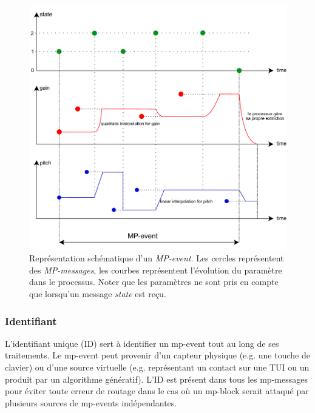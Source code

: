 \begin{figure}[!htbp]
	\captionsetup{format=plain}
	\includegraphics[width=\textwidth]{gfx/04_algorithms/MP-event-model.pdf}
	\caption[Représentation schématique d'un \textit{MP-event}]{Représentation schématique d'un \textit{MP-event}. Les cercles représentent des \textit{MP-messages}, les courbes représentent l'évolution du paramètre dans le processus. Noter que les paramètres ne sont pris en compte que lorsqu'un message \textit{state} est reçu.}
	\label{fig:algorithms:MP-event-model}
\end{figure}


\subsubsection{Identifiant}

\noindent L'identifiant unique (ID) sert à identifier un mp-event tout au long de ses traitements. Le mp-event peut provenir d'un capteur physique (e.g. une touche de clavier) ou d'une source virtuelle (e.g. représentant un contact sur une \gls{TUI} ou un produit par un algorithme génératif).
L'ID est présent dans tous les mp-messages pour éviter toute erreur de routage dans le cas où un mp-block serait attaqué par plusieurs sources de mp-events indépendantes.

